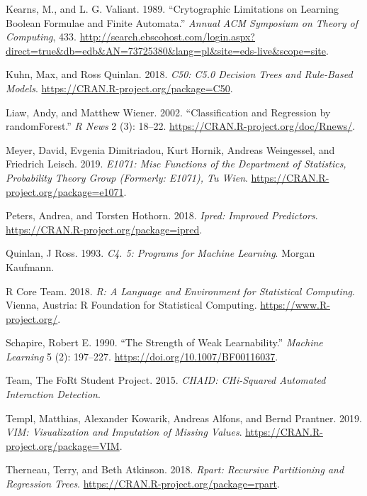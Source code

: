 \documentclass[]{book}
\theoremstyle{plain}
\theoremstyle{definition}
\theoremstyle{definition}
\theoremstyle{definition}
\theoremstyle{definition}
\theoremstyle{remark}
\begin{document}
\leavevmode\hypertarget{ref-kearns1989}{}%
Kearns, M., and L. G. Valiant. 1989. ``Crytographic Limitations on Learning Boolean Formulae and Finite Automata.'' \emph{Annual ACM Symposium on Theory of Computing}, 433. \url{http://search.ebscohost.com/login.aspx?direct=true\&db=edb\&AN=73725380\&lang=pl\&site=eds-live\&scope=site}.

\leavevmode\hypertarget{ref-R-C50}{}%
Kuhn, Max, and Ross Quinlan. 2018. \emph{C50: C5.0 Decision Trees and Rule-Based Models}. \url{https://CRAN.R-project.org/package=C50}.

\leavevmode\hypertarget{ref-R-las}{}%
Liaw, Andy, and Matthew Wiener. 2002. ``Classification and Regression by randomForest.'' \emph{R News} 2 (3): 18--22. \url{https://CRAN.R-project.org/doc/Rnews/}.

\leavevmode\hypertarget{ref-R-e1071}{}%
Meyer, David, Evgenia Dimitriadou, Kurt Hornik, Andreas Weingessel, and Friedrich Leisch. 2019. \emph{E1071: Misc Functions of the Department of Statistics, Probability Theory Group (Formerly: E1071), Tu Wien}. \url{https://CRAN.R-project.org/package=e1071}.

\leavevmode\hypertarget{ref-R-ipred}{}%
Peters, Andrea, and Torsten Hothorn. 2018. \emph{Ipred: Improved Predictors}. \url{https://CRAN.R-project.org/package=ipred}.

\leavevmode\hypertarget{ref-quinlan1993}{}%
Quinlan, J Ross. 1993. \emph{C4. 5: Programs for Machine Learning}. Morgan Kaufmann.

\leavevmode\hypertarget{ref-R-base}{}%
R Core Team. 2018. \emph{R: A Language and Environment for Statistical Computing}. Vienna, Austria: R Foundation for Statistical Computing. \url{https://www.R-project.org/}.

\leavevmode\hypertarget{ref-schapire1990}{}%
Schapire, Robert E. 1990. ``The Strength of Weak Learnability.'' \emph{Machine Learning} 5 (2): 197--227. \url{https://doi.org/10.1007/BF00116037}.

\leavevmode\hypertarget{ref-R-CHAID}{}%
Team, The FoRt Student Project. 2015. \emph{CHAID: CHi-Squared Automated Interaction Detection}.

\leavevmode\hypertarget{ref-R-VIM}{}%
Templ, Matthias, Alexander Kowarik, Andreas Alfons, and Bernd Prantner. 2019. \emph{VIM: Visualization and Imputation of Missing Values}. \url{https://CRAN.R-project.org/package=VIM}.

\leavevmode\hypertarget{ref-R-rpart}{}%
Therneau, Terry, and Beth Atkinson. 2018. \emph{Rpart: Recursive Partitioning and Regression Trees}. \url{https://CRAN.R-project.org/package=rpart}.
\end{document}
